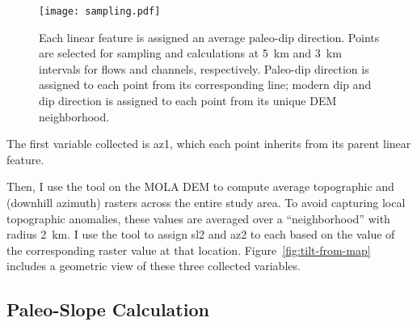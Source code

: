 \begin{figure}
    \centering
    \texttt{[image: sampling.pdf]}
    \caption[Sampling site selection]{Each linear feature is assigned an average paleo-dip direction. Points are selected for sampling and calculations at \qty{5}{\km} and \qty{3}{\km} intervals for flows and channels, respectively. Paleo-dip direction is assigned to each point from its corresponding line; modern dip and dip direction is assigned to each point from its unique \ac{DEM} neighborhood.}%
    \label{fig:sampling}
\end{figure}

\newcommand{\neighborhood}{\qty{2}{\km}}

The first variable collected is \ac{az1}, which each point inherits from its parent linear feature.

Then, I use the  tool on the \ac{MOLA} \ac{DEM} to compute average topographic  and  (downhill azimuth) rasters across the entire study area. To avoid capturing local topographic anomalies, these values are averaged over a ``neighborhood'' with radius \neighborhood. I use the  tool to assign \ac{sl2} and \ac{az2} to each based on the value of the corresponding raster value at that location. Figure~\ref{fig:tilt-from-map} includes a geometric view of these three collected variables.


\subsection{Paleo-Slope Calculation}


